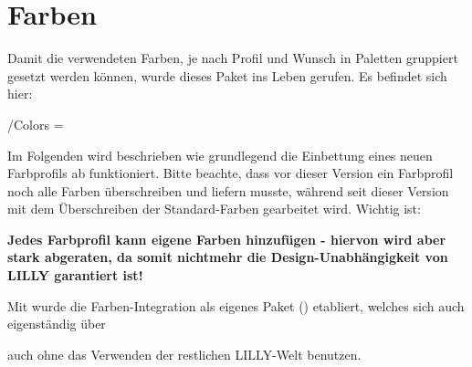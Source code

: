 \chapter[Farben \LILLYxBOXxVersion{\small 1.0.4}]{Farben}
\bigskip\newline
{}Damit die verwendeten Farben, je nach Profil und Wunsch in Paletten gruppiert gesetzt werden können, wurde dieses Paket ins Leben gerufen. Es befindet sich hier:\begin{center}
    /Colors = 
\end{center}
Im Folgenden wird beschrieben wie grundlegend die Einbettung eines neuen Farbprofils ab  funktioniert. Bitte beachte, dass vor dieser Version ein Farbprofil noch alle Farben überschreiben und liefern musste, während seit dieser Version mit dem Überschreiben der Standard-Farben gearbeitet wird. Wichtig ist:\begin{center}
    \small\bfseries Jedes Farbprofil kann eigene Farben hinzufügen - hiervon wird aber stark abgeraten, da somit nichtmehr die Design-Unabhängigkeit von LILLY garantiert ist!
\end{center}
\begin{bemerkung}
    Mit  wurde die Farben-Integration als eigenes Paket () etabliert, welches sich auch eigenständig über \begin{latex}
\usepackage{LILLYxCOLOR}
        \end{latex}
        auch ohne das Verwenden der restlichen LILLY-Welt benutzen.
\end{bemerkung}
